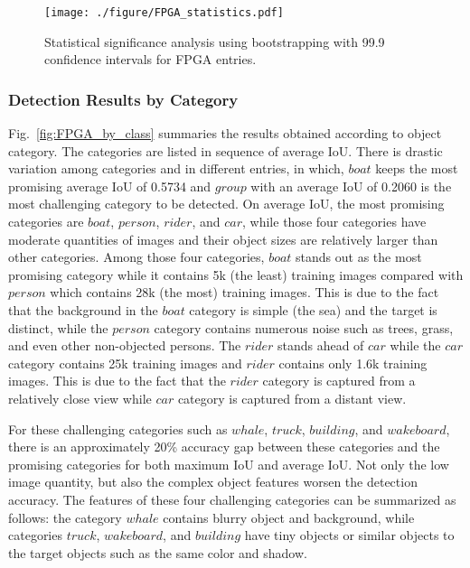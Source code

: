 \documentclass[10pt,journal,compsoc]{IEEEtran}
\begin{document}
\begin{figure}
\centering
  \texttt{[image: ./figure/FPGA\_statistics.pdf]}
  \caption{Statistical significance analysis using bootstrapping with 99.9 confidence intervals for FPGA entries.}
  \label{fig:FPGA_statistics}
\end{figure}






\subsubsection{Detection Results by Category}\label{fpga_category}
Fig.~\ref{fig:FPGA_by_class} summaries the results obtained according to object category. The categories are listed in sequence of average IoU.
There is drastic variation among categories and in different entries, in which, $boat$ keeps the most promising average IoU of 0.5734 and $group$ with an average IoU of 0.2060 is the most challenging category to be detected.
On average IoU, the most promising categories are $boat$, $person$, $rider$, and $car$, while those four categories have moderate quantities of images and their object sizes are relatively larger than other categories.
Among those four categories, $boat$ stands out as the most promising category while it contains 5k (the least) training images compared with $person$ which contains 28k (the most) training images.
This is due to the fact that the background in the $boat$ category is simple (the sea) and the target is distinct, while the $person$ category contains numerous noise such as trees, grass, and even other non-objected persons.
The $rider$ stands ahead of $car$ while the $car$ category contains 25k training images and $rider$ contains only 1.6k training images.
This is due to the fact that the $rider$ category is captured from a relatively close view while $car$ category is captured from a distant view.


For these challenging categories such as $whale$, $truck$, $building$, and $wakeboard$, there is an approximately 20\% accuracy gap between these categories and the promising categories for both maximum IoU and average IoU.
Not only the low image quantity, but also the complex object features worsen the detection accuracy.
The features of these four challenging categories can be summarized as follows: the category $whale$ contains blurry object and background, while categories $truck$, $wakeboard$, and $building$ have tiny objects or similar objects to the target objects such as the same color and shadow.
\end{document}
